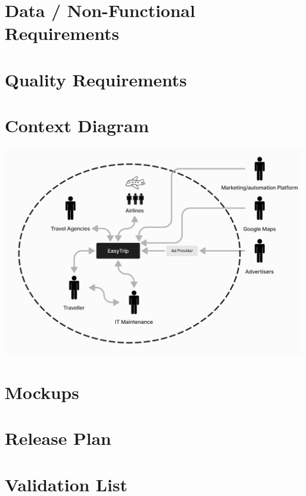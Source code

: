 \documentclass[a4paper]{article}
\begin{document}
\section{Data / Non-Functional Requirements}


\section{Quality Requirements}


\section{Context Diagram}
\includegraphics[width=.99\textwidth]{resources/contextDiagram.png}

\section{Mockups}

\section{Release Plan}


\section{Validation List}

\end{document}
